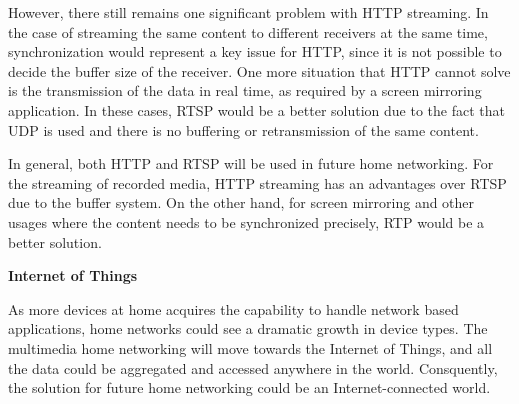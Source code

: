 However, there still remains one significant problem with HTTP streaming. In the
case of streaming the same content to different receivers at the same time,
synchronization would represent a key issue for HTTP, since it is not possible
to decide the buffer size of the receiver. One more situation that HTTP cannot
solve is the transmission of the data in real time, as required by a screen
mirroring application. In these cases, RTSP would be a better solution due to
the fact that UDP is used and there is no buffering or retransmission of the
same content.

In general, both HTTP and RTSP will be used in future home networking. For
the streaming of recorded media, HTTP streaming has an advantages over RTSP
due to the buffer system. On the other hand, for screen mirroring and other
usages where the content needs to be synchronized precisely, RTP would be a
better solution.

\textbf{Internet of Things}

As more devices at home acquires the capability to handle network based
applications, home networks could see a dramatic growth in device types. The
multimedia home networking will move towards the Internet of Things, and all
the data could be aggregated and accessed anywhere in the world. Consquently,
the solution for future home networking could be an Internet-connected
world.
